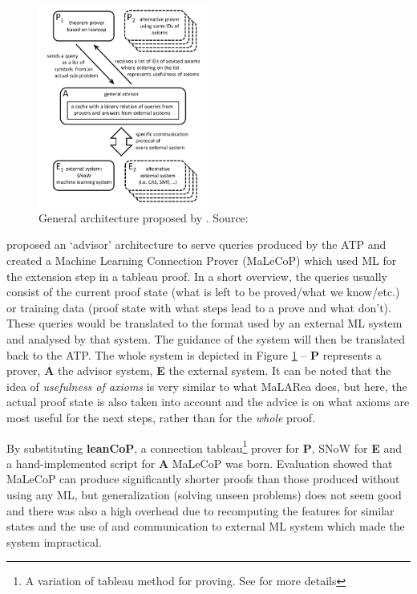 \documentclass{article}
\begin{document}
\begin{figure}[t]
    \centering
    \includegraphics[width=0.5\textwidth]{malecop_arch.png}
    \caption{General architecture proposed by \cite{malecop}. Source: \cite{malecop}}
    \label{fig:malecop}
\end{figure}

\cite{malecop} proposed an `advisor' architecture to serve queries produced by
the ATP and created a Machine Learning Connection Prover (MaLeCoP) which used
ML for the extension step in a tableau proof. In a short overview, the queries
usually consist of the current proof state (what is left to be proved/what we
know/etc.) or training data (proof state with what steps lead to a prove and
what don't). These queries would be translated to the format used by an
external ML system and analysed by that system.  The guidance of the system
will then be translated back to the ATP. The whole system is depicted in Figure
\ref{fig:malecop} -- \textbf{P} represents a prover, \textbf{A} the advisor
system, \textbf{E} the external system. It can be noted that the idea of
\emph{usefulness of axioms} is very similar to what MaLARea does, but here, the
actual proof state is also taken into account and the advice is on what axioms
are most useful for the next steps, rather than for the \emph{whole} proof.

By substituting \textbf{leanCoP}, a connection tableau\footnote{A variation of
tableau method for proving. See \cite{leancop} for more details} prover for
\textbf{P}, SNoW \citep{SNoW} for \textbf{E} and a hand-implemented script for
\textbf{A} MaLeCoP was born. Evaluation showed that MaLeCoP can produce
significantly shorter proofs than those produced without using any ML, but
generalization (solving unseen problems) does not seem good and there was also
a high overhead due to recomputing the features for similar states and the use
of and communication to external ML system which made the system impractical.
\end{document}
